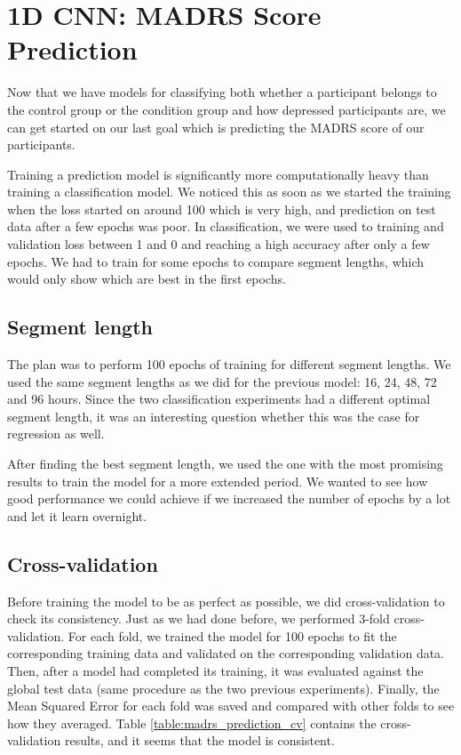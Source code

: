 \section{1D CNN: MADRS Score Prediction}
Now that we have models for classifying both whether a participant belongs to the control group or the condition group and how depressed participants are, 
we can get started on our last goal which is predicting the MADRS score of our participants. 

Training a prediction model is significantly more computationally heavy than training a classification model. We noticed this as soon as we started 
the training when the loss started on around 100 which is very high, and prediction on test data after a few epochs was poor. In classification, 
we were used to training and validation loss between 1 and 0 and reaching a high accuracy after only a few epochs. 
We had to train for some epochs to compare segment lengths, which would only show which are best in the first epochs.

\subsection{Segment length}
The plan was to perform 100 epochs of training for different segment lengths. We used the same segment lengths as we did for the previous model: 16, 24, 48, 72 and 96 hours. 
Since the two classification experiments had a different optimal segment length, it was an interesting question whether this was the case for regression as well. 

After finding the best segment length, we used the one with the most promising results to train the model for a more extended period. We wanted to see how good performance 
we could achieve if we increased the number of epochs by a lot and let it learn overnight. 

\subsection{Cross-validation}
Before training the model to be as perfect as possible, we did cross-validation to check its consistency. Just as we had done before, we performed 3-fold cross-validation. 
For each fold, we trained the model for 100 epochs to fit the corresponding training data and validated on the corresponding validation data. 
Then, after a model had completed its training, it was evaluated against the global test data (same procedure as the two previous experiments). 
Finally, the Mean Squared Error for each fold was saved and compared with other folds to see how they averaged. Table \ref{table:madrs_prediction_cv} 
contains the cross-validation results, and it seems that the model is consistent.

